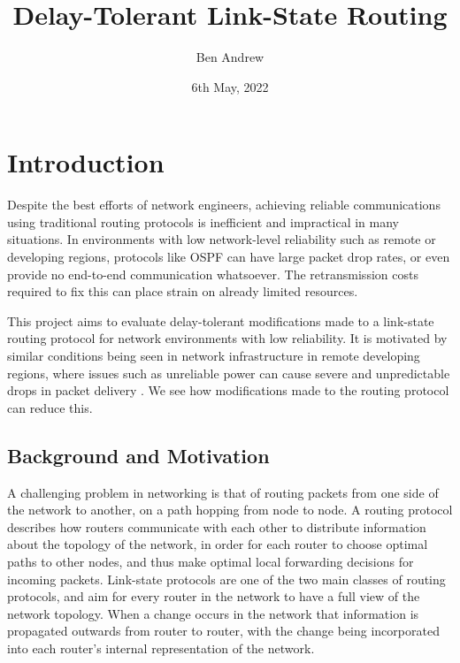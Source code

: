 \documentclass[withindex,glossary,openany]{cam-thesis}
\title{Delay-Tolerant Link-State Routing}
\author{Ben Andrew}
\date{6th May, 2022}
\begin{document}
\frontmatter{}



\listoffigures

\pagebreak

\chapter{Introduction}


Despite the best efforts of network engineers, achieving reliable communications using traditional routing protocols is inefficient and impractical in many situations. In environments with low network-level reliability such as remote or developing regions, protocols like OSPF can have large packet drop rates, or even provide no end-to-end communication whatsoever. The retransmission costs required to fix this can place strain on already limited resources.

This project aims to evaluate delay-tolerant modifications made to a link-state routing protocol for network environments with low reliability. It is motivated by similar conditions being seen in network infrastructure in remote developing regions, where issues such as unreliable power can cause severe and unpredictable drops in packet delivery \cite{DEMMER2007}. We see how modifications made to the routing protocol can reduce this.


\section{Background and Motivation}

A challenging problem in networking is that of routing packets from one side of the network to another, on a path hopping from node to node. A routing protocol describes how routers communicate with each other to distribute information about the topology of the network, in order for each router to choose optimal paths to other nodes, and thus make optimal local forwarding decisions for incoming packets. Link-state protocols \cite{LSR_PROTOCOL} are one of the two main classes of routing protocols, and aim for every router in the network to have a full view of the network topology. When a change occurs in the network that information is propagated outwards from router to router, with the change being incorporated into each router's internal representation of the network.
\end{document}
